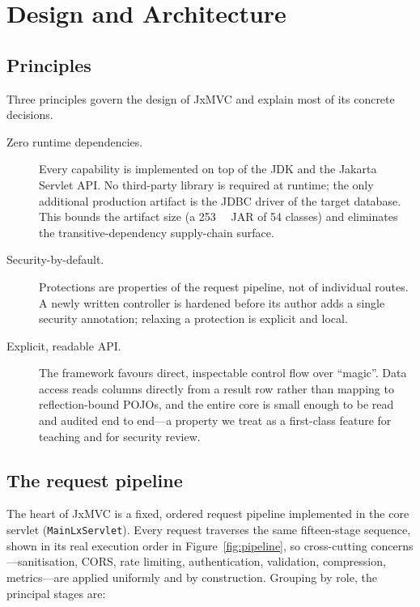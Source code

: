 \section{Design and Architecture}\label{sec:design}

\subsection{Principles}

Three principles govern the design of JxMVC and explain most of its
concrete decisions.

\begin{description}
  \item[Zero runtime dependencies.] Every capability is implemented on
    top of the JDK and the Jakarta Servlet API. No third-party library
    is required at runtime; the only additional production artifact is
    the JDBC driver of the target database. This bounds the artifact
    size (a \SI{253}{\kilo\byte} JAR of 54 classes) and eliminates the
    transitive-dependency supply-chain surface.
  \item[Security-by-default.] Protections are properties of the request
    pipeline, not of individual routes. A newly written controller is
    hardened before its author adds a single security annotation;
    relaxing a protection is explicit and local.
  \item[Explicit, readable API.] The framework favours direct,
    inspectable control flow over ``magic''. Data access reads columns
    directly from a result row rather than mapping to reflection-bound
    POJOs, and the entire core is small enough to be read and audited
    end to end---a property we treat as a first-class feature for
    teaching and for security review.
\end{description}

\subsection{The request pipeline}
\label{sec:pipeline}

The heart of JxMVC is a fixed, ordered request pipeline implemented in
the core servlet (\texttt{MainLxServlet}). Every request traverses the
same fifteen-stage sequence, shown in its real execution order in
Figure~\ref{fig:pipeline}, so cross-cutting concerns---sanitisation,
CORS, rate limiting, authentication, validation, compression,
metrics---are applied uniformly and by construction. Grouping by role,
the principal stages are:

